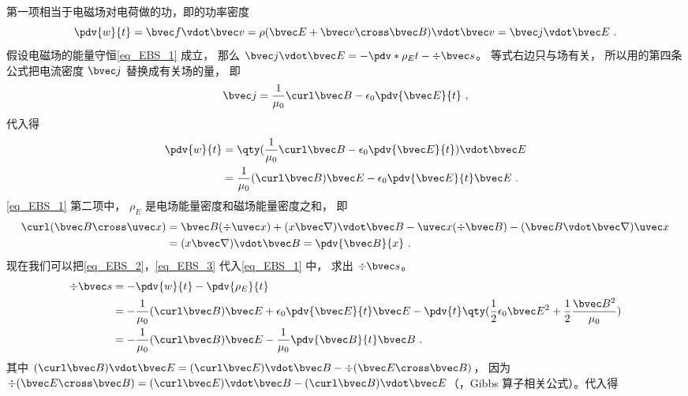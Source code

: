 第一项相当于电磁场对电荷做的功，即的功率密度
\begin{equation}
\pdv{w}{t} = \bvec f \vdot \bvec v = \rho (\bvec E + \bvec v \cross \bvec B) \vdot \bvec v = \bvec j \vdot \bvec E~.
\end{equation} 
假设电磁场的能量守恒\autoref{eq_EBS_1} 成立， 那么 $\bvec j \vdot \bvec E =  - \pdv*{\rho_E}{t} - \div \bvec s$。 等式右边只与场有关， 所以用的第四条公式把电流密度 $\bvec j$ 替换成有关场的量， 即
\begin{equation}
\bvec j = \frac{1}{\mu_0} \curl \bvec B - \epsilon_0 \pdv{\bvec E}{t}~,
\end{equation} 
代入得
\begin{equation}\label{eq_EBS_2}
\begin{aligned}
\pdv{w}{t} &= \qty(\frac{1}{\mu_0} \curl \bvec B - \epsilon_0 \pdv{\bvec E}{t}) \vdot \bvec E\\
&= \frac{1}{\mu_0} (\curl \bvec B)\bvec E - \epsilon_0 \pdv{\bvec E}{t} \bvec E~.
\end{aligned}
\end{equation} 
\autoref{eq_EBS_1} 第二项中， $\rho_E$ 是电场能量密度和磁场能量密度之和， 即
\begin{equation}\label{eq_EBS_3}
\begin{aligned}
\curl (\bvec B \cross \uvec x) &= \bvec B(\div \uvec x) + (x\bvec\nabla) \vdot\bvec B - \uvec x( \div \bvec B) - (\bvec B\vdot\bvec\nabla)\uvec x \\
&= (x\bvec\nabla)\vdot\bvec B = \pdv{\bvec B}{x}~.
\end{aligned}\end{equation} 
现在我们可以把\autoref{eq_EBS_2}，\autoref{eq_EBS_3} 代入\autoref{eq_EBS_1} 中， 求出 $\div \bvec s$。 
\begin{equation}
\begin{aligned}
\div \bvec s &=  - \pdv{w}{t} - \pdv{\rho_E}{t}\\
&= -\frac{1}{\mu_0} (\curl \bvec B)\bvec E + \epsilon_0 \pdv{\bvec E}{t} \bvec E - \pdv{t} \qty( \frac12 \epsilon_0 \bvec E^2 + \frac12 \frac{\bvec B^2}{\mu_0} )\\
&=  - \frac{1}{\mu_0} (\curl \bvec B)\bvec E - \frac{1}{\mu_0} \pdv{\bvec B}{t}\bvec B~.
\end{aligned}
\end{equation} 
其中 $(\curl \bvec B) \vdot \bvec E = (\curl \bvec E) \vdot \bvec B - \div (\bvec E \cross \bvec B)$， 因为 $\div (\bvec E \cross \bvec B) = (\curl \bvec E) \vdot \bvec B - (\curl \bvec B) \vdot \bvec E$（，Gibbs 算子相关公式）。代入得
